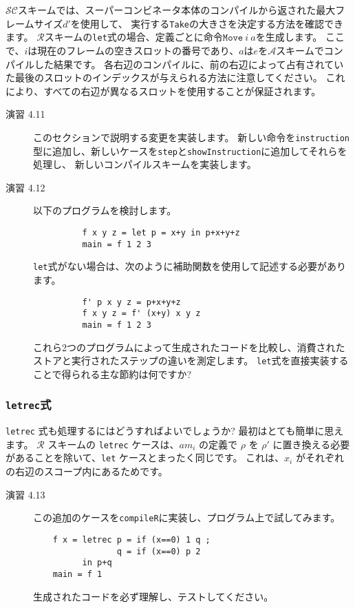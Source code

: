 \documentclass{jarticle}
\begin{document}
$\mathcal{SC}$スキームでは、スーパーコンビネータ本体のコンパイルから返された最大フレームサイズ$d'$を使用して、
実行する\texttt{Take}の大きさを決定する方法を確認できます。
$\mathcal{R}$スキームの\texttt{let}式の場合、定義ごとに命令$\texttt{Move} ~ i ~ a$を生成します。
ここで、$i$は現在のフレームの空きスロットの番号であり、$a$は$e$を$\mathcal{A}$スキームでコンパイルした結果です。
各右辺のコンパイルに、前の右辺によって占有されていた最後のスロットのインデックスが与えられる方法に注意してください。
これにより、すべての右辺が異なるスロットを使用することが保証されます。

\begin{description}
	\item[演習 4.11] このセクションで説明する変更を実装します。
		新しい命令を\texttt{instruction}型に追加し、新しいケースを\texttt{step}と\texttt{showInstruction}に追加してそれらを処理し、
		新しいコンパイルスキームを実装します。
	\item[演習 4.12] 以下のプログラムを検討します。
		\begin{verbatim}
          f x y z = let p = x+y in p+x+y+z
          main = f 1 2 3
        \end{verbatim}
		\texttt{let}式がない場合は、次のように補助関数を使用して記述する必要があります。
		\begin{verbatim}
          f' p x y z = p+x+y+z
          f x y z = f' (x+y) x y z
          main = f 1 2 3
        \end{verbatim}
		これら2つのプログラムによって生成されたコードを比較し、消費されたストアと実行されたステップの違いを測定します。
		\texttt{let}式を直接実装することで得られる主な節約は何ですか?
\end{description}

\subsubsection{\texttt{letrec}式}

\texttt{letrec} 式も処理するにはどうすればよいでしょうか?
最初はとても簡単に思えます。
$\mathcal{R}$ スキームの \texttt{letrec} ケースは、$am_i$ の定義で $\rho$ を $\rho'$ に置き換える必要があることを除いて、\texttt{let} ケースとまったく同じです。
これは、$x_i$ がそれぞれの右辺のスコープ内にあるためです。

\begin{description}
	\item[演習 4.13] この追加のケースを\texttt{compileR}に実装し、プログラム上で試してみます。
		\begin{verbatim}
    f x = letrec p = if (x==0) 1 q ;
                 q = if (x==0) p 2
          in p+q
    main = f 1
  \end{verbatim}
		生成されたコードを必ず理解し、テストしてください。
\end{description}
\end{document}
